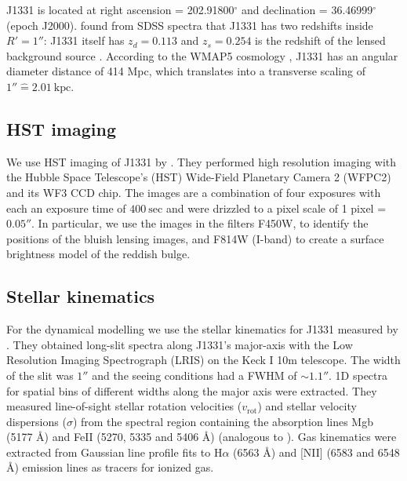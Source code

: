 \documentclass[useAMS,usenatbib]{mnras}
\begin{document}
J1331 is located at right ascension = 202.91800$^\circ$ and declination = 36.46999$^\circ$ (epoch J2000). \citet{SWELLSI} found from SDSS spectra that J1331 has two redshifts inside $R'=1''$: J1331 itself has $z_d = 0.113$ and $z_s = 0.254$ is the redshift of the lensed background source \citep{SWELLSIII}. According to the WMAP5 cosmology \citep{WMAP5cosm}, J1331 has an angular diameter distance of 414 Mpc, which translates into a transverse scaling of $1'' \hat{=} 2.01~\text{kpc}$.

\subsection{HST imaging}

We use HST imaging of J1331 by \citet{SWELLSI}. They performed high resolution imaging with the Hubble Space Telescope's (HST) Wide-Field Planetary Camera 2 (WFPC2) and its WF3 CCD chip. The images are a combination of four exposures with each an exposure time of $400~\text{sec}$ and were drizzled to a pixel scale of 1 pixel = $0.05''$. In particular, we use the images in the filters F450W, to identify the positions of the bluish lensing images, and F814W (I-band) to create a surface brightness model of the reddish bulge.

\subsection{Stellar kinematics}

For the dynamical modelling we use the stellar kinematics for J1331 measured by \citet{SWELLSV}. They obtained long-slit spectra along J1331's major-axis with the Low Resolution Imaging Spectrograph (LRIS) on the Keck I 10m telescope. The width of the slit was $1''$ and the seeing conditions had a FWHM of $\sim 1.1''$. 1D spectra for spatial bins of different widths along the major axis were extracted. They measured line-of-sight stellar rotation velocities ($v_\text{rot}$) and stellar velocity dispersions ($\sigma$) from the spectral region containing the absorption lines Mgb (5177 \AA) and FeII (5270, 5335 and 5406 \AA) (analogous to \citealt{SWELLSII}). Gas kinematics were extracted from Gaussian line profile fits to H$\alpha$ (6563 \AA) and [NII] (6583 and 6548 \AA) emission lines as tracers for ionized gas.
\end{document}
